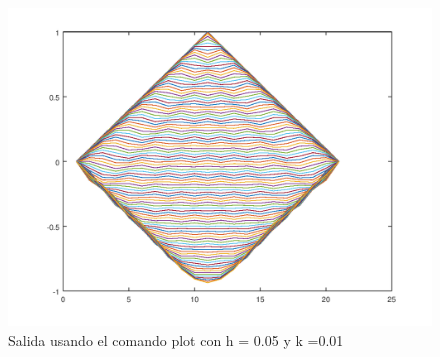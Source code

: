 \documentclass{article}
\begin{document}
\begin{figure}[H]
    \centering
    \includegraphics[scale=0.7]{3.4.png}
    \caption{Salida usando el comando plot con h = 0.05 y k =0.01}
\end{figure}
\end{document}
